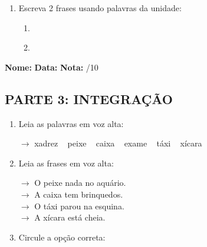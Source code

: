 \begin{exercicio}
\begin{enumerate}[resume]
  \item Escreva 2 frases usando palavras da unidade:
  \begin{enumerate}[label=\alph*)]
    \item \underline{\hspace{8cm}}
    \item \underline{\hspace{8cm}}
  \end{enumerate}

\end{enumerate}

\end{exercicio}



\begin{exercicio}

\noindent\textbf{Nome:} \underline{\hspace{3.2cm}} \quad \textbf{Data:} \underline{\hspace{1.6cm}} \quad \textbf{Nota:} \underline{\hspace{0.9cm}}/10


\subsection*{PARTE 3: INTEGRAÇÃO}

\begin{enumerate}[resume]

  \item Leia as palavras em voz alta:
  \begin{center}
  $\rightarrow$ xadrez ~ peixe ~ caixa ~ exame ~ táxi ~ xícara
  \end{center}

  \item Leia as frases em voz alta:
  \begin{center}
  $\rightarrow$ O peixe nada no aquário.\\
  $\rightarrow$ A caixa tem brinquedos.\\
  $\rightarrow$ O táxi parou na esquina.\\
  $\rightarrow$ A xícara está cheia.\\
  \end{center}

  \item Circule a opção correta:
  \begin{enumerate}[label=(\alph*)]


\end{enumerate}
\end{enumerate}
\end{exercicio}
